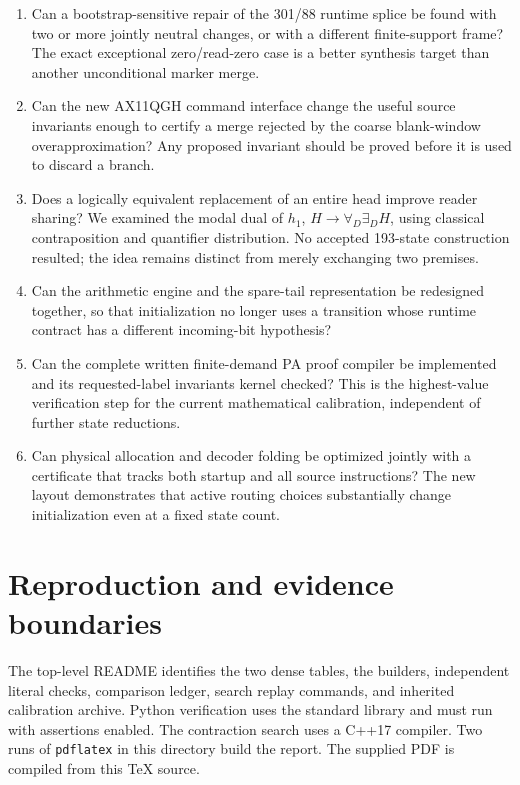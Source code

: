 \documentclass[11pt,letterpaper]{article}
\newcommand{\file}[1]{\texttt{\nolinkurl{#1}}}
\begin{document}
\begin{enumerate}
\item Can a bootstrap-sensitive repair of the 301/88 runtime splice be
found with two or more jointly neutral changes, or with a different
finite-support frame? The exact exceptional zero/read-zero case is a
better synthesis target than another unconditional marker merge.
\item Can the new AX11QGH command interface change the useful source
invariants enough to certify a merge rejected by the coarse blank-window
overapproximation? Any proposed invariant should be proved before it is
used to discard a branch.
\item Does a logically equivalent replacement of an entire head improve
reader sharing? We examined the modal dual of $h_1$,
$H\to\forall_D\exists_D H$, using classical contraposition and
quantifier distribution. No accepted 193-state construction resulted;
the idea remains distinct from merely exchanging two premises.
\item Can the arithmetic engine and the spare-tail representation be
redesigned together, so that initialization no longer uses a transition
whose runtime contract has a different incoming-bit hypothesis?
\item Can the complete written finite-demand PA proof compiler be
implemented and its requested-label invariants kernel checked? This is
the highest-value verification step for the current mathematical
calibration, independent of further state reductions.
\item Can physical allocation and decoder folding be optimized jointly
with a certificate that tracks both startup and all source instructions?
The new layout demonstrates that active routing choices substantially
change initialization even at a fixed state count.
\end{enumerate}

\section{Reproduction and evidence boundaries}

The top-level README identifies the two dense tables, the builders,
independent literal checks, comparison ledger, search replay commands,
and inherited calibration archive. Python verification uses the standard
library and must run with assertions enabled. The contraction search
uses a C++17 compiler. Two runs of \file{pdflatex} in this directory build
the report. The supplied PDF is compiled from this TeX source.
\end{document}
